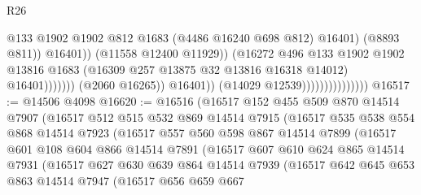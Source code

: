 \begin{lexlean}{R26}
\begin{coremodule}
                                                            @133
                                                            @1902
                                                            @1902
                                                            @812
                                                            @1683
                                                            (@4486 @16240 @698 @812)
                                                            @16401)
                                                          (@8893 @811))
                                                        @16401))
                                                    (@11558 @12400 @11929))
                                                  (@16272
                                                    @496
                                                    @133
                                                    @1902
                                                    @1902
                                                    @13816
                                                    @1683
                                                    (@16309 @257 @13875 @32 @13816 @16318 @14012)
                                                    @16401)))))))
                                      (@2060 @16265))
                                    @16401))
                                (@14029 @12539)))))))))))))))
@16517 := @14506 @4098
@16620 := @16516
    (@16517
      @152
      @455
      @509
      @870
      @14514
      @7907
      (@16517
        @512
        @515
        @532
        @869
        @14514
        @7915
        (@16517
          @535
          @538
          @554
          @868
          @14514
          @7923
          (@16517
            @557
            @560
            @598
            @867
            @14514
            @7899
            (@16517
              @601
              @108
              @604
              @866
              @14514
              @7891
              (@16517
                @607
                @610
                @624
                @865
                @14514
                @7931
                (@16517
                  @627
                  @630
                  @639
                  @864
                  @14514
                  @7939
                  (@16517
                    @642
                    @645
                    @653
                    @863
                    @14514
                    @7947
                    (@16517
                      @656
                      @659
                      @667

\end{coremodule}
\end{lexlean}
